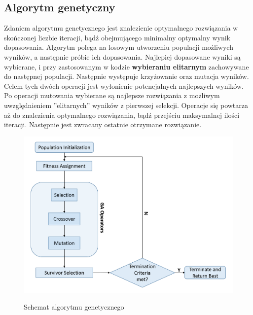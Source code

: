 \subsection{Algorytm genetyczny}
Zdaniem algorytmu genetycznego jest znalezienie optymalnego rozwiązania w skończonej liczbie iteracji, bądź obejmującego minimalny optymalny wynik dopasowania. Algorytm polega na losowym utworzeniu populacji możliwych wyników, a następnie próbie ich dopasowania. Najlepiej dopasowane wyniki są wybierane, i przy zastosowanym w kodzie \textbf{wybieraniu elitarnym} zachowywane do następnej populacji. Następnie występuje krzyżowanie oraz mutacja wyników. Celem tych dwóch operacji jest wyłonienie potencjalnych najlepszych wyników. Po operacji mutowania wybierane są najlepsze rozwiązania z możliwym uwzględnieniem ''elitarnych'' wyników z pierwszej selekcji. Operacje się powtarza aż do znalezienia optymalnego rozwiązania, bądź przejściu maksymalnej ilości iteracji. Następnie jest zwracany ostatnie otrzymane rozwiązanie.

\begin{figure}[H]
    \includegraphics[width=\textwidth]{images/ga_schema.png}
    \label{fig:ga}
    \caption{Schemat algorytmu genetycznego\cite{ai}}
\end{figure}